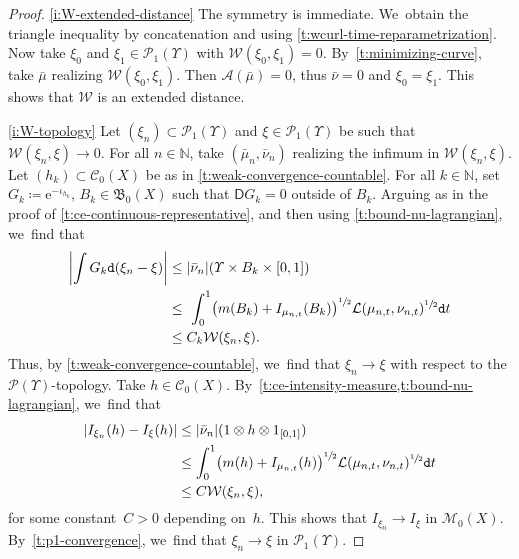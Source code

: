 \documentclass[JEP,XML,SOM,Unicode,published]{cedram}
\theoremstyle{definition}
\theoremstyle{remark}
\DeclarePairedDelimiter{\paren}{\lparen}{\rparen}
\DeclarePairedDelimiter{\abs}{\lvert}{\rvert}
\begin{document}
\skpt
\begin{proof}
\cref{i:W-extended-distance} The symmetry is immediate. We~obtain the triangle inequality by concatenation and using \cref{t:wcurl-time-reparametrization}.
Now take $\xi_{0}$ and $\xi_{1} \in \mathscr{P}_{1}(\varUpsilon)$ with $\mathcal{W}(\xi_{0}, \xi_{1}) = 0$.
By~\cref{t:minimizing-curve}, take $\bar{\mu}$ realizing $\mathcal{W}(\xi_{0}, \xi_{1})$.
Then $\mathcal{A}(\bar{\mu}) = 0$, thus $\bar{\nu} =0$ and $\xi_{0} = \xi_{1}$.
This shows that $\mathcal{W}$ is an extended distance.

\cref{i:W-topology}
Let $(\xi_{n}) \subset \mathscr{P}_{1}(\varUpsilon)$ and $\xi \in \mathscr{P}_{1}(\varUpsilon)$ be such that $\mathcal{W}(\xi_{n}, \xi) \to 0$.
For all $n \in \mathbb{N}$, take $(\bar{\mu}_{n}, \bar{\nu}_{n})$ realizing the infimum in $\mathcal{W}(\xi_{n}, \xi)$.
Let $(h_{k}) \subset \mathscr{C}_{0}(X)$ be as in \cref{t:weak-convergence-countable}.
For all $k \in \mathbb{N}$, set $G_{k} \coloneq \mathrm{e}^{-\iota_{h_{k}}}$, $B_{k} \in \mathfrak{B}_{0}(X)$ such that $\mathsf{D} G_{k} = 0$ outside of $B_{k}$.
Arguing as in the proof of \cref{t:ce-continuous-representative}, and then using \cref{t:bound-nu-lagrangian}, we~find that
\begin{equation*}
\begin{split}
\abs*{ \int G_{k} \mathtt{d} (\xi_{n} - \xi) } & \leq \abs{\bar{\nu}_{n}}(\varUpsilon \times B_{k} \times [0,1]) \\
& \leq \ \int_{0}^{1} \paren*{m(B_{k}) + I_{\mu_{n,t}}(B_{k})}^{\sfrac{1}{2}} \mathcal{L}\paren{\mu_{n,t}, \nu_{n,t}}^{\sfrac{1}{2}} \mathtt{d} t \\
& \leq C_{k} \mathcal{W}(\xi_{n}, \xi).
\end{split}
\end{equation*}
Thus, by \cref{t:weak-convergence-countable}, we~find that $\xi_{n} \to \xi$ with respect to the $\mathscr{P}(\varUpsilon)$-topology.
Take $h \in \mathscr{C}_{0}(X)$.
By~\cref{t:ce-intensity-measure,t:bound-nu-lagrangian}, we~find that
\begin{equation*}
\begin{split}
\abs*{ I_{\xi_{n}}(h) - I_{\xi}(h) } & \leq \abs{ \bar{\nu}_{n} }(1 \otimes h \otimes 1_{[0,1]}) \\
& \leq \int_{0}^{1} \paren*{m(h) + I_{\mu_{n,t}}(h)}^{\sfrac{1}{2}} \mathcal{L}\paren{\mu_{n,t}, \nu_{n,t}}^{\sfrac{1}{2}} \mathtt{d} t \\
& \leq C \mathcal{W}(\xi_{n}, \xi),
\end{split}
\end{equation*}
for some constant~$C>0$ depending on~$h$.
This shows that $I_{\xi_{n}} \to I_{\xi}$ in $\mathscr{M}_{0}(X)$.
By~\cref{t:p1-convergence}, we~find that $\xi_{n} \to \xi$ in $\mathscr{P}_{1}(\varUpsilon)$.


\end{proof}
\end{document}
